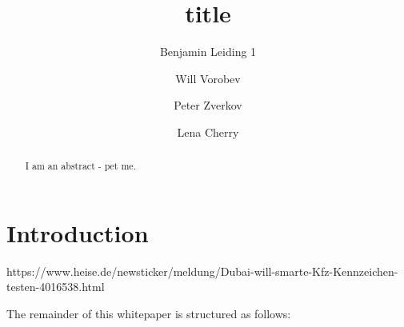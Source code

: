 \documentclass{llncs}
\begin{document}
	{
	\title{title}
	
	\author{Benjamin Leiding 1 \and Will Vorobev \and Peter Zverkov \and Lena Cherry}
	
	
	
	\maketitle


	\begin{abstract}
		
		I am an abstract - pet me.

		
	\end{abstract}
	
	

	
	\section{Introduction}
		\label{s:introduction}
	
		https://www.heise.de/newsticker/meldung/Dubai-will-smarte-Kfz-Kennzeichen-testen-4016538.html

		The remainder of this whitepaper is structured as follows: 


}
\end{document}
